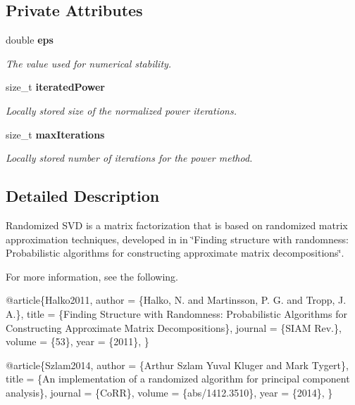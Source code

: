 \subsection*{Private Attributes}
\begin{DoxyCompactItemize}
\item 
double {\bf eps}
\begin{DoxyCompactList}\small\item\em The value used for numerical stability. \end{DoxyCompactList}\item 
size\+\_\+t {\bf iterated\+Power}
\begin{DoxyCompactList}\small\item\em Locally stored size of the normalized power iterations. \end{DoxyCompactList}\item 
size\+\_\+t {\bf max\+Iterations}
\begin{DoxyCompactList}\small\item\em Locally stored number of iterations for the power method. \end{DoxyCompactList}\end{DoxyCompactItemize}


\subsection{Detailed Description}
Randomized S\+VD is a matrix factorization that is based on randomized matrix approximation techniques, developed in in \char`\"{}\+Finding structure with randomness\+:
\+Probabilistic algorithms for constructing approximate matrix decompositions\char`\"{}. 

For more information, see the following.


\begin{DoxyCode}
@article\{Halko2011,
  author  = \{Halko, N. and Martinsson, P. G. and Tropp, J. A.\},
  title   = \{Finding Structure with Randomness: Probabilistic Algorithms \textcolor{keywordflow}{for}
             Constructing Approximate Matrix Decompositions\},
  journal = \{SIAM Rev.\},
  volume  = \{53\},
  year    = \{2011\},
\}
\end{DoxyCode}



\begin{DoxyCode}
@article\{Szlam2014,
  author  = \{Arthur Szlam Yuval Kluger and Mark Tygert\},
  title   = \{An implementation of a randomized algorithm \textcolor{keywordflow}{for} principal
             component analysis\},
  journal = \{CoRR\},
  volume  = \{abs/1412.3510\},
  year    = \{2014\},
\}
\end{DoxyCode}


